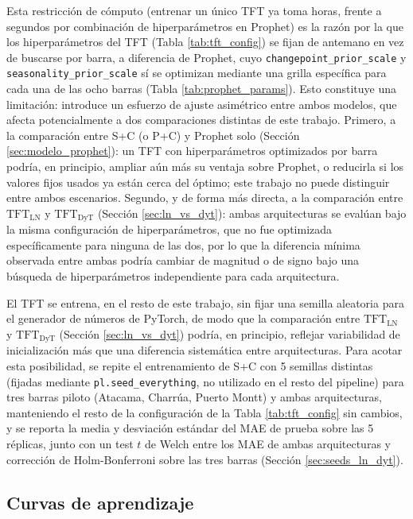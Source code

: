 Esta restricción de cómputo (entrenar un único TFT ya toma horas, frente a segundos por combinación de hiperparámetros en Prophet) es la razón por la que los hiperparámetros del TFT (Tabla \ref{tab:tft_config}) se fijan de antemano en vez de buscarse por barra, a diferencia de Prophet, cuyo \texttt{changepoint\_prior\_scale} y \texttt{seasonality\_prior\_scale} sí se optimizan mediante una grilla específica para cada una de las ocho barras (Tabla \ref{tab:prophet_params}). Esto constituye una limitación: introduce un esfuerzo de ajuste asimétrico entre ambos modelos, que afecta potencialmente a dos comparaciones distintas de este trabajo. Primero, a la comparación entre S+C (o P+C) y Prophet solo (Sección \ref{sec:modelo_prophet}): un TFT con hiperparámetros optimizados por barra podría, en principio, ampliar aún más su ventaja sobre Prophet, o reducirla si los valores fijos usados ya están cerca del óptimo; este trabajo no puede distinguir entre ambos escenarios. Segundo, y de forma más directa, a la comparación entre $\text{TFT}_\text{LN}$ y $\text{TFT}_\text{DyT}$ (Sección \ref{sec:ln_vs_dyt}): ambas arquitecturas se evalúan bajo la misma configuración de hiperparámetros, que no fue optimizada específicamente para ninguna de las dos, por lo que la diferencia mínima observada entre ambas podría cambiar de magnitud o de signo bajo una búsqueda de hiperparámetros independiente para cada arquitectura.

El TFT se entrena, en el resto de este trabajo, sin fijar una semilla aleatoria para el generador de números de PyTorch, de modo que la comparación entre $\text{TFT}_\text{LN}$ y $\text{TFT}_\text{DyT}$ (Sección \ref{sec:ln_vs_dyt}) podría, en principio, reflejar variabilidad de inicialización más que una diferencia sistemática entre arquitecturas. Para acotar esta posibilidad, se repite el entrenamiento de S+C con 5 semillas distintas (fijadas mediante \texttt{pl.seed\_everything}, no utilizado en el resto del pipeline) para tres barras piloto (Atacama, Charrúa, Puerto Montt) y ambas arquitecturas, manteniendo el resto de la configuración de la Tabla \ref{tab:tft_config} sin cambios, y se reporta la media y desviación estándar del MAE de prueba sobre las 5 réplicas, junto con un test $t$ de Welch entre los MAE de ambas arquitecturas y corrección de Holm-Bonferroni \cite{Holm1979} sobre las tres barras (Sección \ref{sec:seeds_ln_dyt}).

\subsection{Curvas de aprendizaje}

